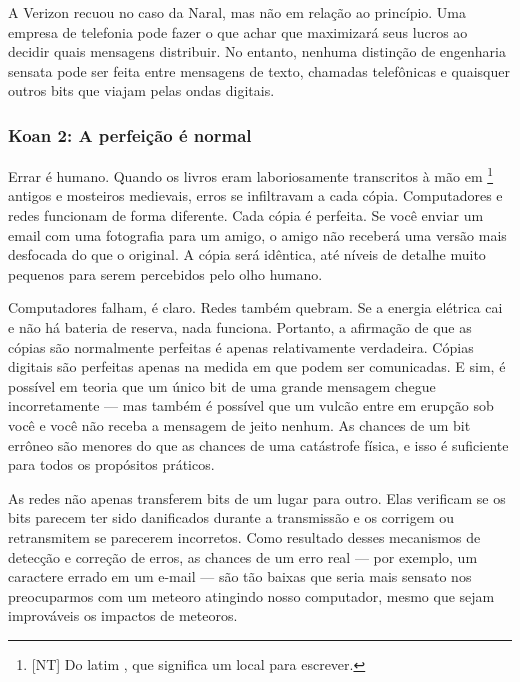 A Verizon recuou no caso da Naral, mas não em relação ao princípio. Uma empresa 
de telefonia pode fazer o que achar que maximizará seus lucros ao decidir quais 
mensagens distribuir. No entanto, nenhuma distinção de engenharia sensata pode 
ser feita entre mensagens de texto, chamadas telefônicas e quaisquer outros bits
que viajam pelas ondas digitais.

\label{cap1:exp-dig-koans:2}
\subsubsection*{Koan 2: A perfeição é normal}
Errar é humano. Quando os livros eram laboriosamente transcritos à mão em 
\footnote{[NT] Do latim , que significa
um local para escrever.} antigos e mosteiros medievais, erros se infiltravam a
cada cópia. Computadores e redes funcionam de forma diferente. Cada cópia é
perfeita.
Se você enviar um email com uma fotografia para um amigo, o amigo não receberá
uma versão mais desfocada do que o original. A cópia será idêntica, até níveis
de detalhe muito pequenos para serem percebidos pelo olho humano.

Computadores falham, é claro. Redes também quebram. Se a energia elétrica cai e
não há bateria de reserva, nada funciona. Portanto, a afirmação de que as cópias
são normalmente perfeitas é apenas relativamente verdadeira. Cópias digitais são
perfeitas apenas na medida em que podem ser comunicadas. E sim, é possível em
teoria que um único bit de uma grande mensagem chegue incorretamente --- mas
também é possível que um vulcão entre em erupção sob você e você não receba a
mensagem de jeito nenhum. As chances de um bit errôneo são menores do que as
chances de uma catástrofe física, e isso é suficiente para todos os propósitos
práticos.

As redes não apenas transferem bits de um lugar para outro. Elas verificam se os
bits parecem ter sido danificados durante a transmissão e os corrigem ou 
retransmitem se parecerem incorretos. Como resultado desses mecanismos de 
detecção e correção de erros, as chances de um erro real --- por exemplo, um
caractere errado em um e-mail --- são tão baixas que seria mais sensato nos
preocuparmos com um meteoro atingindo nosso computador, mesmo que sejam
improváveis os impactos de meteoros.

